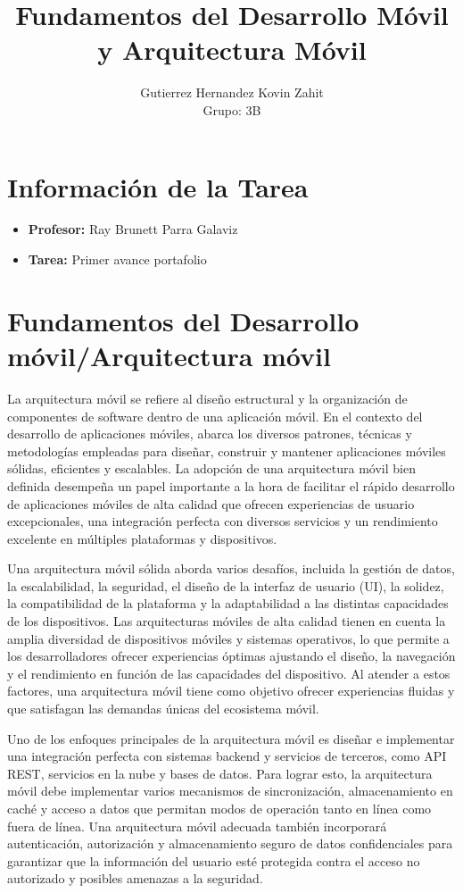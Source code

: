 \documentclass{article}
\title{Fundamentos del Desarrollo Móvil y Arquitectura Móvil}
\author{Gutierrez Hernandez Kovin Zahit \\ Grupo: 3B}
\date{}
\begin{document}
	
	\maketitle
	
	\section*{Información de la Tarea}
	\begin{itemize}
		\item \textbf{Profesor:} Ray Brunett Parra Galaviz
		\item \textbf{Tarea:} Primer avance portafolio
	\end{itemize}
	
	\section*{Fundamentos del Desarrollo móvil/Arquitectura móvil}
	
	La arquitectura móvil se refiere al diseño estructural y la organización de componentes de software dentro de una aplicación móvil. En el contexto del desarrollo de aplicaciones móviles, abarca los diversos patrones, técnicas y metodologías empleadas para diseñar, construir y mantener aplicaciones móviles sólidas, eficientes y escalables. La adopción de una arquitectura móvil bien definida desempeña un papel importante a la hora de facilitar el rápido desarrollo de aplicaciones móviles de alta calidad que ofrecen experiencias de usuario excepcionales, una integración perfecta con diversos servicios y un rendimiento excelente en múltiples plataformas y dispositivos.
	
	Una arquitectura móvil sólida aborda varios desafíos, incluida la gestión de datos, la escalabilidad, la seguridad, el diseño de la interfaz de usuario (UI), la solidez, la compatibilidad de la plataforma y la adaptabilidad a las distintas capacidades de los dispositivos. Las arquitecturas móviles de alta calidad tienen en cuenta la amplia diversidad de dispositivos móviles y sistemas operativos, lo que permite a los desarrolladores ofrecer experiencias óptimas ajustando el diseño, la navegación y el rendimiento en función de las capacidades del dispositivo. Al atender a estos factores, una arquitectura móvil tiene como objetivo ofrecer experiencias fluidas y que satisfagan las demandas únicas del ecosistema móvil.
	
	Uno de los enfoques principales de la arquitectura móvil es diseñar e implementar una integración perfecta con sistemas backend y servicios de terceros, como API REST, servicios en la nube y bases de datos. Para lograr esto, la arquitectura móvil debe implementar varios mecanismos de sincronización, almacenamiento en caché y acceso a datos que permitan modos de operación tanto en línea como fuera de línea. Una arquitectura móvil adecuada también incorporará autenticación, autorización y almacenamiento seguro de datos confidenciales para garantizar que la información del usuario esté protegida contra el acceso no autorizado y posibles amenazas a la seguridad.
	
\end{document}
